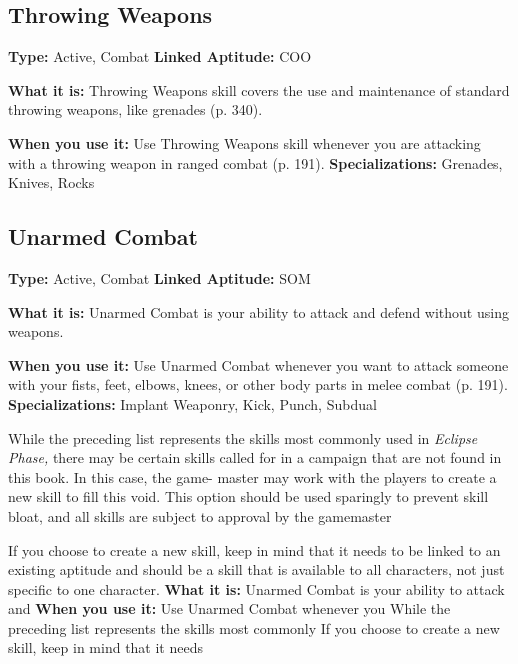 \subsection{Throwing Weapons}

\textbf{Type:} Active, Combat
\textbf{Linked Aptitude:} COO

\textbf{What it is:} Throwing Weapons skill covers the use 
and maintenance of standard throwing weapons, like 
grenades (p. 340).

\textbf{When you use it:} Use Throwing Weapons skill 
whenever you are attacking with a throwing weapon 
in ranged combat (p. 191).
\textbf{Specializations:} Grenades, Knives, Rocks

\subsection{Unarmed Combat}

\textbf{Type:} Active, Combat
\textbf{Linked Aptitude:} SOM

\textbf{What it is:} Unarmed Combat is your ability to attack and 
defend without using weapons.

\textbf{When you use it:} Use Unarmed Combat whenever you 
want to attack someone with your fists, feet, elbows, knees, 
or other body parts in melee combat (p. 191).
\textbf{Specializations:} Implant Weaponry, Kick, Punch, Subdual

While the preceding list represents the skills most commonly 
used in \textit{Eclipse Phase,} there may be certain skills called for in a 
campaign that are not found in this book. In this case, the game-
master may work with the players to create a new skill to fill 
this void. This option should be used sparingly to prevent skill 
bloat, and all skills are subject to approval by the gamemaster

If you choose to create a new skill, keep in mind that it needs 
to be linked to an existing aptitude and should be a skill that 
is available to all characters, not just specific to one character.
\textbf{What it is:} Unarmed Combat is your ability to attack and 
\textbf{When you use it:} Use Unarmed Combat whenever you 
While the preceding list represents the skills most commonly 
If you choose to create a new skill, keep in mind that it needs 
 
